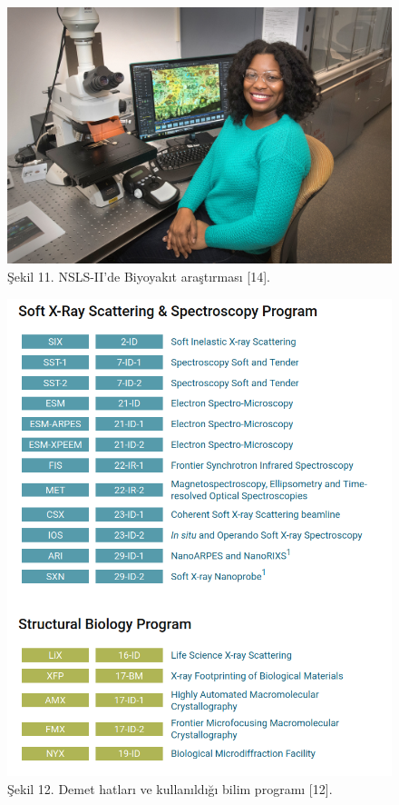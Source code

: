 \documentclass{article}
\begin{document}
		\begin{figure}[h!]
 \centering
\includegraphics[width=13cm]{33696668366_c810eac721_k.jpg}
\caption*{Şekil 11. NSLS-II'de Biyoyakıt araştırması [14].}
	\end{figure}
	


\newpage

		\begin{figure}[h!]
 \centering
\includegraphics[width=12cm]{program1.png}
\caption*{Şekil 12. Demet hatları ve kullanıldığı bilim programı [12].}
	\end{figure}
	
\end{document}
